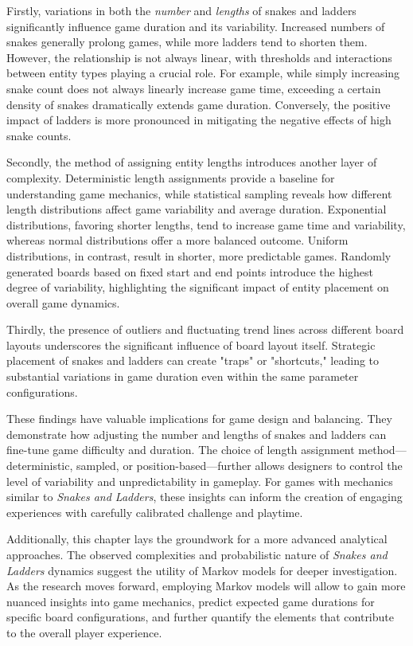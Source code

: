 \documentclass[12pt]{report}
\begin{document}
	Firstly, variations in both the \textit{number} and \textit{lengths} of snakes and ladders significantly influence game duration and its variability. Increased numbers of snakes generally prolong games, while more ladders tend to shorten them. However, the relationship is not always linear, with thresholds and interactions between entity types playing a crucial role. For example, while simply increasing snake count does not always linearly increase game time, exceeding a certain density of snakes dramatically extends game duration. Conversely, the positive impact of ladders is more pronounced in mitigating the negative effects of high snake counts.
	
	Secondly, the method of assigning entity lengths introduces another layer of complexity. Deterministic length assignments provide a baseline for understanding game mechanics, while statistical sampling reveals how different length distributions affect game variability and average duration. Exponential distributions, favoring shorter lengths, tend to increase game time and variability, whereas normal distributions offer a more balanced outcome. Uniform distributions, in contrast, result in shorter, more predictable games. Randomly generated boards based on fixed start and end points introduce the highest degree of variability, highlighting the significant impact of entity placement on overall game dynamics.
	
	Thirdly, the presence of outliers and fluctuating trend lines across different board layouts underscores the significant influence of board layout itself. Strategic placement of snakes and ladders can create "traps" or "shortcuts," leading to substantial variations in game duration even within the same parameter configurations.
	
	These findings have valuable implications for game design and balancing. They demonstrate how adjusting the number and lengths of snakes and ladders can fine-tune game difficulty and duration. The choice of length assignment method—deterministic, sampled, or position-based—further allows designers to control the level of variability and unpredictability in gameplay. For games with mechanics similar to \textit{Snakes and Ladders}, these insights can inform the creation of engaging experiences with carefully calibrated challenge and playtime.
	
	Additionally, this chapter lays the groundwork for a more advanced analytical approaches. The observed complexities and probabilistic nature of \textit{Snakes and Ladders} dynamics suggest the utility of Markov models for deeper investigation. As the research moves forward, employing Markov models will allow to gain more nuanced insights into game mechanics, predict expected game durations for specific board configurations, and further quantify the elements that contribute to the overall player experience. 
	
\end{document}

